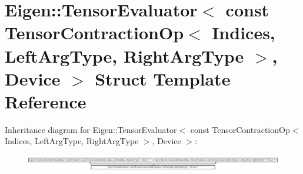 \hypertarget{struct_eigen_1_1_tensor_evaluator_3_01const_01_tensor_contraction_op_3_01_indices_00_01_left_arg1f297d3eabde0efec8e4d9b1aa9abe5a}{}\section{Eigen\+:\+:Tensor\+Evaluator$<$ const Tensor\+Contraction\+Op$<$ Indices, Left\+Arg\+Type, Right\+Arg\+Type $>$, Device $>$ Struct Template Reference}
\label{struct_eigen_1_1_tensor_evaluator_3_01const_01_tensor_contraction_op_3_01_indices_00_01_left_arg1f297d3eabde0efec8e4d9b1aa9abe5a}
Inheritance diagram for Eigen\+:\+:Tensor\+Evaluator$<$ const Tensor\+Contraction\+Op$<$ Indices, Left\+Arg\+Type, Right\+Arg\+Type $>$, Device $>$\+:\begin{figure}[H]
\begin{center}
\leavevmode
\includegraphics[height=0.683761cm]{struct_eigen_1_1_tensor_evaluator_3_01const_01_tensor_contraction_op_3_01_indices_00_01_left_arg1f297d3eabde0efec8e4d9b1aa9abe5a}
\end{center}
\end{figure}
